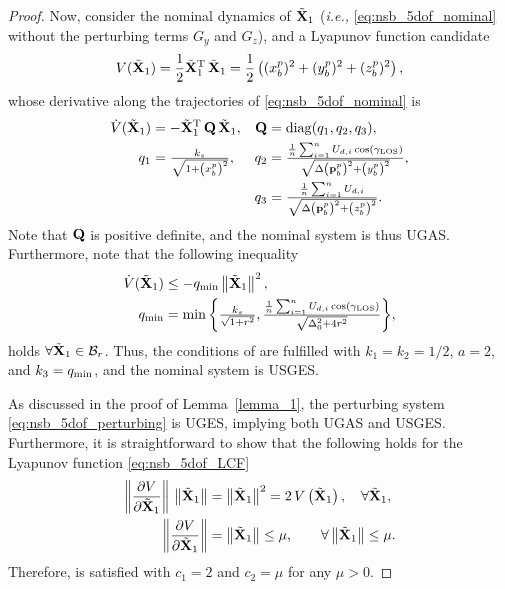 \begin{proof}
Now, consider the nominal dynamics of $\tilde{\mathbf{X}}_1$ (\emph{i.e.,} \eqref{eq:nsb_5dof_nominal} without the perturbing terms $G_y$ and $G_z$), and a Lyapunov function candidate
\begin{equation}
    V(\tilde{\mathbf{X}}_1) = \frac{1}{2} \tilde{\mathbf{X}}_1^{\mathrm{T}}\,\tilde{\mathbf{X}}_1 = \frac{1}{2} \left((x_b^p)^2 + (y_b^p)^2 + (z_b^p)^2\right), \label{eq:nsb_5dof_LCF}
\end{equation}
whose derivative along the trajectories of \eqref{eq:nsb_5dof_nominal} is
\begin{subequations}
    \begin{align}
        \dot{V}(\tilde{\mat{X}}_1) &= - \tilde{\mat{X}}_1\T\,\mat{Q}\,\tilde{\mat{X}}_1, &
        \mat{Q} &= {\rm diag}(q_1, q_2, q_3), \\
        q_1 &= \scale[1]{\frac{k_{s}}{\sqrt{1+\left(x_b^p\right)^2}}}, &
        q_2 &= \scale[1]{{\frac{\frac{1}{n}\sum_{i=1}^n U_{d,i}\cos\left(\gamma_{\rm LOS}\right)}{\sqrt{\Delta\left(\mat{p}_b^p\right)^2 + \left(y_b^p\right)^2}}}}, \\
        &&q_3 &= \scale[1]{\frac{\frac{1}{n} \sum_{i=1}^n U_{d,i}}{\sqrt{\Delta\left(\mat{p}_b^p\right)^2 + \left(z_b^p\right)^2}}}. 
    \end{align}
\end{subequations}
Note that $\mathbf{Q}$ is positive definite, and the nominal system is thus UGAS.
Furthermore, note that the following inequality
\begin{subequations}
    \begin{align}
        \dot{V}(\tilde{\mat{X}}_1) &\leq - q_{\rm min} \norm{\tilde{\mat{X}}_1}^2, \\
        q_{\rm min} &= \scale[1]{\min \left\{ \frac{k_{s}}{\sqrt{1+r^2}}, \frac{\frac{1}{n} \sum_{i=1}^n U_{d,i}\cos\left(\gamma_{\rm LOS}\right)}{\sqrt{\Delta_0^2 + 4r^2}} \right\}},
    \end{align}
\end{subequations}
holds $\forall \tilde{\mathbf{X}}_1 \in \mathcal{B}_r$.
Thus, the conditions of \cite[Theorem 5]{pettersen_lyapunov_2017} are fulfilled with $k_1 = k_2 = 1/2$, $a = 2$, and $k_3 = q_{\rm min}$, and the nominal system is USGES.

As discussed in the proof of Lemma~\ref{lemma_1}, the perturbing system \eqref{eq:nsb_5dof_perturbing} is UGES, implying both UGAS and USGES.
Furthermore, it is straightforward to show that the following holds for the Lyapunov function \eqref{eq:nsb_5dof_LCF}
\begin{align}
    \left\| \frac{\partial V}{\partial \tilde{\mathbf{X}}_1} \right\| \, \left\|\tilde{\mathbf{X}}_1\right\| &= \left\|\tilde{\mathbf{X}}_1\right\|^2 = 2\,V\left(\tilde{\mathbf{X}}_1\right), \quad \forall \tilde{\mathbf{X}}_1, \\
    \left\| \frac{\partial V}{\partial \tilde{\mathbf{X}}_1} \right\| &= \left\|\tilde{\mathbf{X}}_1\right\| \leq \mu, \quad \quad \forall \left\|\tilde{\mathbf{X}}_1\right\| \leq \mu.
\end{align}
Therefore, \cite[Assumption 1]{pettersen_lyapunov_2017} is satisfied with $c_1 = 2$ and $c_2 = \mu$ for any $\mu > 0$.


\end{proof}
